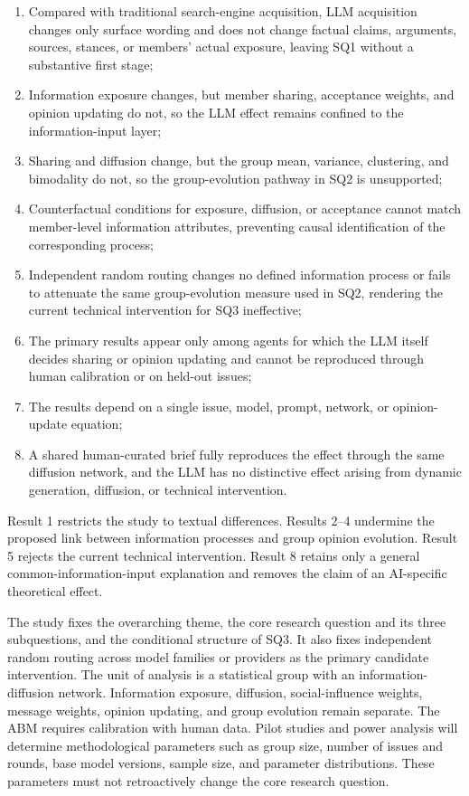 \documentclass[11pt,a4paper]{article}
\begin{document}
\begin{enumerate}
\item Compared with traditional search-engine acquisition, LLM acquisition changes only surface wording and does not change factual claims, arguments, sources, stances, or members' actual exposure, leaving SQ1 without a substantive first stage;
\item Information exposure changes, but member sharing, acceptance weights, and opinion updating do not, so the LLM effect remains confined to the information-input layer;
\item Sharing and diffusion change, but the group mean, variance, clustering, and bimodality do not, so the group-evolution pathway in SQ2 is unsupported;
\item Counterfactual conditions for exposure, diffusion, or acceptance cannot match member-level information attributes, preventing causal identification of the corresponding process;
\item Independent random routing changes no defined information process or fails to attenuate the same group-evolution measure used in SQ2, rendering the current technical intervention for SQ3 ineffective;
\item The primary results appear only among agents for which the LLM itself decides sharing or opinion updating and cannot be reproduced through human calibration or on held-out issues;
\item The results depend on a single issue, model, prompt, network, or opinion-update equation;
\item A shared human-curated brief fully reproduces the effect through the same diffusion network, and the LLM has no distinctive effect arising from dynamic generation, diffusion, or technical intervention.
\end{enumerate}

Result 1 restricts the study to textual differences. Results 2--4 undermine the proposed link between information processes and group opinion evolution. Result 5 rejects the current technical intervention. Result 8 retains only a general common-information-input explanation and removes the claim of an AI-specific theoretical effect.

The study fixes the overarching theme, the core research question and its three subquestions, and the conditional structure of SQ3. It also fixes independent random routing across model families or providers as the primary candidate intervention. The unit of analysis is a statistical group with an information-diffusion network. Information exposure, diffusion, social-influence weights, message weights, opinion updating, and group evolution remain separate. The ABM requires calibration with human data. Pilot studies and power analysis will determine methodological parameters such as group size, number of issues and rounds, base model versions, sample size, and parameter distributions. These parameters must not retroactively change the core research question.
\end{document}
